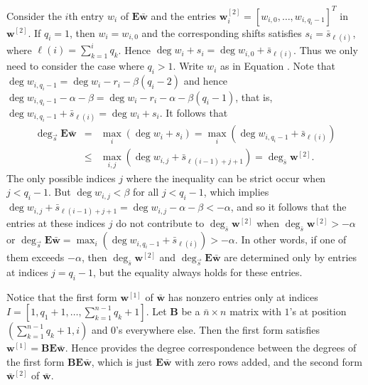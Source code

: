 \begin{pf}
Consider the $i$th entry $w_{i}$ of $\mathbf{E}\bar{\mathbf{w}}$
and the %
entries $\mathbf{w}_{i}^{[2]}=\left[w_{i,0},\dots,w_{i,q_{i}-1}\right]^{T}$
in $\mathbf{w}^{[2]}$. If $q_{i}=1$, then $w_{i}=w_{i,0}$ and the
corresponding shifts satisfies $s_{i}=\bar{s}_{\ell(i)}$, where $\ell(i)=\sum_{k=1}^{i}q_{k}$.
Hence $\deg w_{i}+s_{i}=\deg w_{i,0}+\bar{s}_{\ell(i)}$. Thus we
only need to consider the case where $q_{i}>1$. Write $w_{i}$ as
in Equation . Note that $\deg w_{i,q_{i}-1}=\deg w_{i}-r_{i}-\beta\left(q_{i}-2\right)$
and hence $\deg w_{i,q_{i}-1}-\alpha-\beta=\deg w_{i}-r_{i}-\alpha-\beta\left(q_{i}-1\right)$,
that is, $\deg w_{i,q_{i}-1}+\bar{s}_{\ell(i)}=\deg w_{i}+s_{i}$.
It follows that \begin{eqnarray*}
\deg_{\vec{s}}\mathbf{E}\bar{\mathbf{w}} & = & \max_{i}(\deg w_{i}+s_{i})=\max_{i}(\deg w_{i,q_{i}-1}+\bar{s}_{\ell(i)})\\
 & \le & \max_{i,j}\left(\deg w_{i,j}+\bar{s}_{\ell(i-1)+j+1}\right)=\deg_{\bar{s}}\mathbf{w}^{[2]}.\end{eqnarray*}
 The only possible indices $j$ where the inequality can be strict
occur when $j<q_{i}-1$. But $\deg w_{i,j}<\beta$ for all $j<q_{i}-1$,
which implies $\deg w_{i,j}+\bar{s}_{\ell(i-1)+j+1}=\deg w_{i,j}-\alpha-\beta<-\alpha$,
and so it follows that the entries at these indices $j$ do not contribute
to $\deg_{\bar{s}}\mathbf{w}^{[2]}$ when $\deg_{\bar{s}}\mathbf{w}^{[2]}>-\alpha$
or $\deg_{\vec{s}}\mathbf{E}\bar{\mathbf{w}}=\max_{i}(\deg w_{i,q_{i}-1}+\bar{s}_{\ell(i)})>-\alpha$.
In other words, if one of them exceeds $-\alpha$, then $\deg_{\bar{s}}\mathbf{w}^{[2]}$
and $\deg_{\vec{s}}\mathbf{E}\bar{\mathbf{w}}$ are determined only
by entries at indices $j=q_{i}-1$, but the equality always holds
for these entries. \end{pf}
\begin{rem}
Notice that the first form $\mathbf{w}^{\left[1\right]}$ of $\bar{\mathbf{w}}$
has nonzero entries only at indices $I=[1,q_{1}+1,\dots,\sum_{k=1}^{n-1}q_{k}+1]$.
Let $\mathbf{B}$ be a $\bar{n}\times n$ matrix with $1$'s at position
$(\sum_{k=1}^{n-1}q_{k}+1,i)$ and 0's everywhere else. Then the first
form satisfies\textup{ $\mathbf{w}^{[1]}=\mathbf{B}\mathbf{E}\bar{\mathbf{w}}$.}
Hence  provides the degree correspondence
between the degrees of the first form $\mathbf{B}\mathbf{E}\bar{\mathbf{w}}$,
which is just $\mathbf{E}\bar{\mathbf{w}}$ with zero rows added,
and the second form $\bar{\mathbf{w}}^{[2]}$ of $\bar{\mathbf{w}}$.\end{rem}
